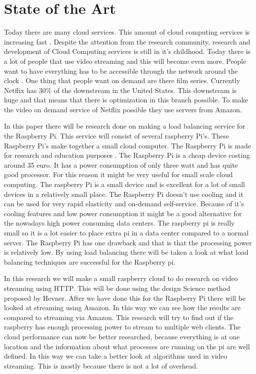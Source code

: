 \documentclass{sig-alternate-br}
\begin{document}
\section{State of the Art}
Today there are many cloud services. This amount of cloud computing services is increasing fast \cite{armbrust:2009}.  Despite the attention
from the research community, research and development of
Cloud Computing services is still in it's childhood\cite{tso:2013}. Today there is a lot of people that use video streaming and this will become even more. People want to have everything has to be accessible through the network around the clock \cite{youseff:2008}. One thing that people want on demand are there film series. Currently Netflix has 30\% of the downstream in the United States. This downstream is huge and that means that there is optimization in this branch possible. To make the video on demand service of Netflix possible they use servers from Amazon. 

In this paper there will be research done on making a load balancing service for the Raspberry Pi.  This service will consist of several raspberry Pi's. These Raspberry Pi's make together a small cloud computer.  The Raspberry Pi is made for research and education purposes \cite{raspberry-pi}. The Raspberry Pi is a cheap device costing around 35 euro. It has a power consumption of only three watt and has quite good processor. For this reason it might be very useful for small scale cloud computing. The raspberry Pi is a small device and is excellent for a lot of small devices in a relatively small place. The Raspberry Pi doesn't use cooling and it can be used for very rapid elasticity and on-demand self-service. Because of it's cooling features and low power consumption it might be a good alternative for the nowadays high power consuming data centers. The raspberry pi is really small so it is a lot easier to place extra pi in a data center compared to a normal server. The Raspberry Pi has one drawback and that is that the processing power is relatively low. By using load balancing there will be taken a look at what load balancing techniques are successful for the Raspberry pi. 

In this research we will make a small raspberry cloud to do research on video streaming using HTTP. This will be done using the design Science method proposed by Hevner\cite{hevner:2007}. After we have done this for the Raspberry Pi there will be looked at streaming using Amazon. In this way we can see how the results are compared to streaming via Amazon. This research will try to find out if the raspberry has enough processing power to stream to multiple web clients. The cloud performance can now be better researched, because everything is at one location and the information about what processes are running on the pi are well defined. In this way we can take a better look at algorithms used in video streaming. This is mostly because there is not a lot of overhead. 
\end{document}
